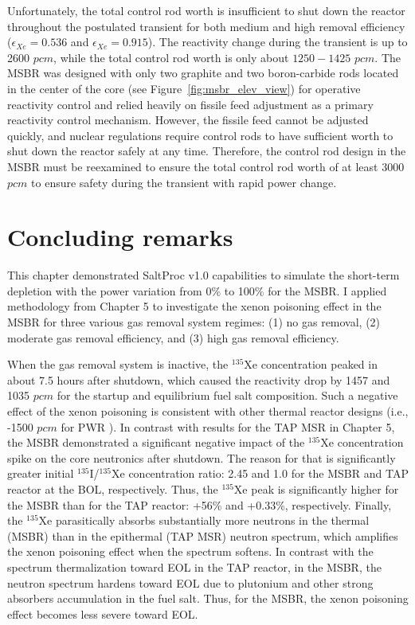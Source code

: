 Unfortunately, the total control rod worth is insufficient to shut down the 
reactor throughout the postulated transient for both medium and high removal 
efficiency ($\epsilon_{Xe}=0.536$ and $\epsilon_{Xe}=0.915$). The reactivity 
change during the 
transient is up to 2600 $pcm$, while the total control rod worth is only about 
$1250-1425$ $pcm$. The \gls{MSBR} was designed with only two graphite and two 
boron-carbide rods located in the center of the core (see 
Figure~\ref{fig:msbr_elev_view}) for operative reactivity control and relied 
heavily on fissile feed adjustment as a primary reactivity control 
mechanism. However, the fissile feed cannot be adjusted quickly, and nuclear  
regulations require control rods to have sufficient worth to shut down the 
reactor safely at any time. Therefore, the control rod design in the 
\gls{MSBR} must be reexamined to ensure the total control rod worth of at 
least 3000 $pcm$ to ensure safety during the transient with rapid power change.


\section{Concluding remarks}
This chapter demonstrated SaltProc v1.0 capabilities to simulate the 
short-term depletion with the power variation from 0\% to 100\% for the 
\gls{MSBR}. I applied methodology from Chapter 5 to investigate the xenon 
poisoning effect in the \gls{MSBR} for three various gas removal system 
regimes: (1) no gas removal, (2) moderate gas removal efficiency, and (3) high 
gas removal efficiency. 

When the gas removal system is inactive, the $^{135}$Xe concentration peaked 
in about 7.5 hours after shutdown, which caused the reactivity drop by 1457 
and 1035 $pcm$ for the startup and equilibrium fuel salt composition. Such a
negative effect of the xenon poisoning is consistent with other thermal 
reactor designs (i.e., -1500 $pcm$ for \gls{PWR} 
\cite{rykhlevskii_impact_2019}). In contrast with results for the \gls{TAP} 
\gls{MSR} in Chapter 5, the \gls{MSBR} demonstrated a significant negative 
impact of the $^{135}$Xe concentration spike on the core neutronics after 
shutdown. The reason for that is significantly greater initial 
$^{135}$I/$^{135}$Xe concentration ratio: 2.45 and 1.0 for the \gls{MSBR} and 
\gls{TAP} reactor at the \gls{BOL}, respectively. Thus, the $^{135}$Xe peak is 
significantly higher for the \gls{MSBR} than for the \gls{TAP} reactor: +56\% 
and +0.33\%, respectively. Finally, the $^{135}$Xe parasitically absorbs 
substantially more neutrons in the thermal (\gls{MSBR}) than in the epithermal 
(\gls{TAP} \gls{MSR}) neutron spectrum, which amplifies the xenon poisoning 
effect when the spectrum softens. In contrast with the spectrum thermalization 
toward \gls{EOL} in the \gls{TAP} reactor, in the \gls{MSBR}, the neutron 
spectrum hardens toward \gls{EOL} due to plutonium and other strong absorbers 
accumulation in the fuel salt. Thus, for the \gls{MSBR}, the xenon poisoning 
effect becomes less severe toward \gls{EOL}. 

